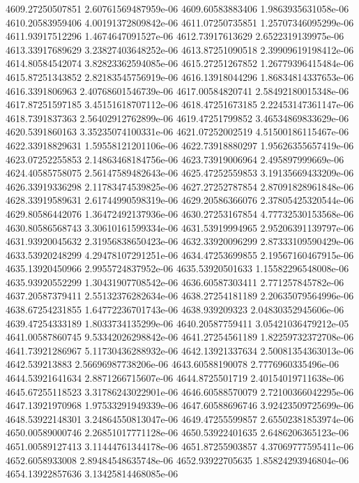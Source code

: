 {4609.27250507851 2.60761569487959e-06
4609.60583883406 1.9863935631058e-06
4610.20583959406 4.00191372809842e-06
4611.07250735851 1.25707346095299e-06
4611.93917512296 1.4674647091527e-06
4612.73917613629 2.6522319139975e-06
4613.33917689629 3.23827403648252e-06
4613.87251090518 2.39909619198412e-06
4614.80584542074 3.82823362594085e-06
4615.27251267852 1.26779396415484e-06
4615.87251343852 2.82183545756919e-06
4616.13918044296 1.86834814337653e-06
4616.3391806963 2.40768601546739e-06
4617.00584820741 2.58492180015348e-06
4617.87251597185 3.45151618707112e-06
4618.47251673185 2.22453147361147e-06
4618.7391837363 2.56402912762899e-06
4619.47251799852 3.46534869833629e-06
4620.5391860163 3.35235074100331e-06
4621.07252002519 4.51500186115467e-06
4622.33918829631 1.59558121201106e-06
4622.73918880297 1.95626355657419e-06
4623.07252255853 2.14863468184756e-06
4623.73919006964 2.495897999669e-06
4624.40585758075 2.56147589482643e-06
4625.47252559853 3.19135669433209e-06
4626.33919336298 2.11783474539825e-06
4627.27252787854 2.87091828961848e-06
4628.33919589631 2.61744990598319e-06
4629.20586366076 2.37805425320544e-06
4629.80586442076 1.36472492137936e-06
4630.27253167854 4.77732530153568e-06
4630.80586568743 3.30610161599334e-06
4631.53919994965 2.95206391139797e-06
4631.93920045632 2.31956838650423e-06
4632.33920096299 2.87333109590429e-06
4633.53920248299 4.29478107291251e-06
4634.47253699855 2.19567160467915e-06
4635.13920450966 2.9955724837952e-06
4635.53920501633 1.15582296548008e-06
4635.93920552299 1.30431907708542e-06
4636.60587303411 2.771257845782e-06
4637.20587379411 2.55132376282634e-06
4638.27254181189 2.20635079564996e-06
4638.67254231855 1.64772236701743e-06
4638.939209323 2.04830352945606e-06
4639.47254333189 1.8033734135299e-06
4640.20587759411 3.05421036479212e-05
4641.00587860745 9.53342026298842e-06
4641.27254561189 1.82259732372708e-06
4641.73921286967 5.11730436288932e-06
4642.13921337634 2.50081354363013e-06
4642.539213883 2.56696987738206e-06
4643.60588190078 2.7776960335496e-06
4644.53921641634 2.8871266715607e-06
4644.8725501719 2.40154019711638e-06
4645.67255118523 3.31786243022901e-06
4646.60588570079 2.72100366042295e-06
4647.13921970968 1.97533291949339e-06
4647.60588696746 3.92423509725699e-06
4648.53922148301 3.24864550813047e-06
4649.47255599857 2.65502381853974e-06
4650.00589000746 2.26851017771128e-06
4650.53922401635 2.6486206365123e-06
4651.00589127413 3.11444761344178e-06
4651.87255903857 4.37069777595411e-06
4652.6058933008 2.89484548635748e-06
4652.93922705635 1.85824293946804e-06
4654.13922857636 3.13425814468085e-06
}
